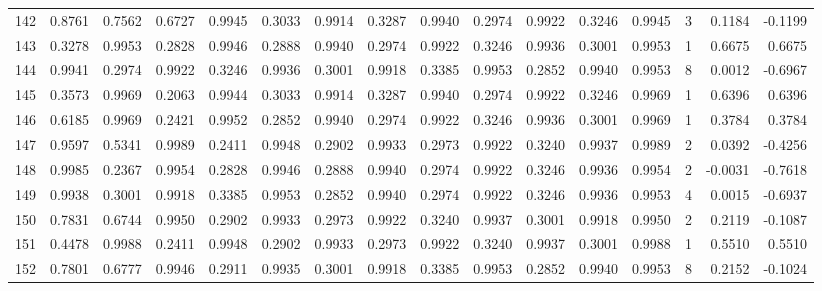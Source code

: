 \begin{tabular}{lrrrrrrrrrrrrrrr}
142 &      0.8761 &  0.7562 &  0.6727 &  0.9945 &  0.3033 &  0.9914 &  0.3287 &  0.9940 &  0.2974 &  0.9922 &   0.3246 &     0.9945 &      3 &                    0.1184 &                    -0.1199 \\
143 &      0.3278 &  0.9953 &  0.2828 &  0.9946 &  0.2888 &  0.9940 &  0.2974 &  0.9922 &  0.3246 &  0.9936 &   0.3001 &     0.9953 &      1 &                    0.6675 &                     0.6675 \\
144 &      0.9941 &  0.2974 &  0.9922 &  0.3246 &  0.9936 &  0.3001 &  0.9918 &  0.3385 &  0.9953 &  0.2852 &   0.9940 &     0.9953 &      8 &                    0.0012 &                    -0.6967 \\
145 &      0.3573 &  0.9969 &  0.2063 &  0.9944 &  0.3033 &  0.9914 &  0.3287 &  0.9940 &  0.2974 &  0.9922 &   0.3246 &     0.9969 &      1 &                    0.6396 &                     0.6396 \\
146 &      0.6185 &  0.9969 &  0.2421 &  0.9952 &  0.2852 &  0.9940 &  0.2974 &  0.9922 &  0.3246 &  0.9936 &   0.3001 &     0.9969 &      1 &                    0.3784 &                     0.3784 \\
147 &      0.9597 &  0.5341 &  0.9989 &  0.2411 &  0.9948 &  0.2902 &  0.9933 &  0.2973 &  0.9922 &  0.3240 &   0.9937 &     0.9989 &      2 &                    0.0392 &                    -0.4256 \\
148 &      0.9985 &  0.2367 &  0.9954 &  0.2828 &  0.9946 &  0.2888 &  0.9940 &  0.2974 &  0.9922 &  0.3246 &   0.9936 &     0.9954 &      2 &                   -0.0031 &                    -0.7618 \\
149 &      0.9938 &  0.3001 &  0.9918 &  0.3385 &  0.9953 &  0.2852 &  0.9940 &  0.2974 &  0.9922 &  0.3246 &   0.9936 &     0.9953 &      4 &                    0.0015 &                    -0.6937 \\
150 &      0.7831 &  0.6744 &  0.9950 &  0.2902 &  0.9933 &  0.2973 &  0.9922 &  0.3240 &  0.9937 &  0.3001 &   0.9918 &     0.9950 &      2 &                    0.2119 &                    -0.1087 \\
151 &      0.4478 &  0.9988 &  0.2411 &  0.9948 &  0.2902 &  0.9933 &  0.2973 &  0.9922 &  0.3240 &  0.9937 &   0.3001 &     0.9988 &      1 &                    0.5510 &                     0.5510 \\
152 &      0.7801 &  0.6777 &  0.9946 &  0.2911 &  0.9935 &  0.3001 &  0.9918 &  0.3385 &  0.9953 &  0.2852 &   0.9940 &     0.9953 &      8 &                    0.2152 &                    -0.1024 \\

\end{tabular}
